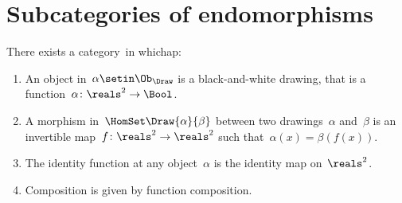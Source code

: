 
\section{Subcategories of endomorphisms}
\label{sec:Draw}


\index{\Draw}
\begin{definition}[Drawings]
    \label{def:Draw}
    There exists a category~\Draw in whichap:
    \begin{enumerate}
        \item An object in~$\alpha\setin \Ob_\Draw$ is a black-and-white drawing,
              that is a function~$\alpha \colon \reals^2 \to \Bool$.
        \item A morphism in~$\HomSet\Draw{\alpha}{\beta}$ between two drawings~$\alpha$ and~$\beta$ is an invertible map~$f\colon \reals^2 \to \reals^2$ such that~$\alpha(x) = \beta(f(x))$.
        \item The identity function at any object~$\alpha$ is the identity map on~$\reals^2$.
        \item Composition is given by function composition.
    \end{enumerate}
\end{definition}

